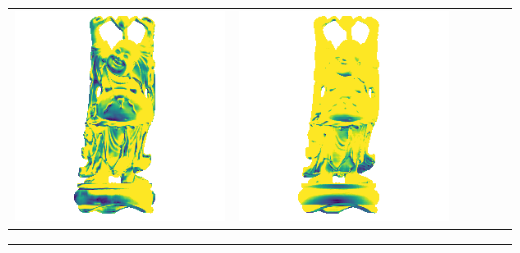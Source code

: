 \begin{center}
\begin{tabularx}{\linewidth}{@{}Y@{}Y@{}Y@{}Y@{}Y@{}Y@{}}
\includegraphics[width=\linewidth]{semisynthetic/20160617_20_marrnet_err.png} &
\includegraphics[width=\linewidth]{semisynthetic/20160617_20_ef_err.png} \\
\end{tabularx}
\begin{center}\rule{0.5\linewidth}{\linethickness}\end{center}


\end{center}
